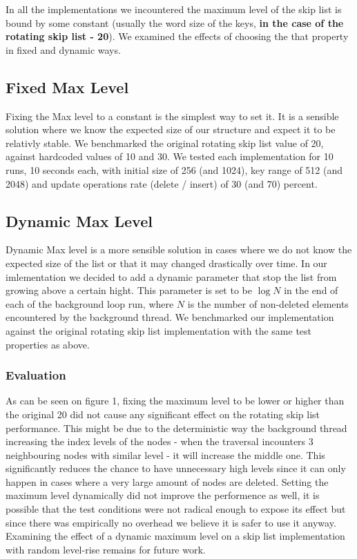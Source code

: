 \documentclass{article}
\begin{document}
In all the implementations we incountered the maximum level of the skip list is bound by some constant (usually the word size of the keys, \textbf{in the case of the rotating skip list - 20}). We examined the effects of choosing the that property in fixed and dynamic ways.

\subsection{Fixed Max Level}
\label{ssec:fml}

Fixing the Max level to a constant is the simplest way to set it. It is a sensible solution where we know the expected size of our structure and expect it to be relativly stable. We benchmarked the original rotating skip list value of 20, against hardcoded values of 10 and 30. We tested each implementation for 10 runs, 10 seconds each, with initial size of 256 (and 1024), key range of 512 (and 2048) and update operations rate (delete / insert) of 30 (and 70) percent.

\subsection{Dynamic Max Level}
\label{ssec:dml}

Dynamic Max level is a more sensible solution in cases where we do not know the expected size of the list or that it may changed drastically over time. In our imlementation we decided to add a dynamic parameter that stop the list from growing above a certain hight. This parameter is set to be $\log{N}$ in the end of each of the background loop run, where $N$ is the number of non-deleted elements encountered by the background thread. We benchmarked our implementation against the original rotating skip list implementation with the same test properties as above.

\subsubsection{Evaluation}
\label{sssec:ml-evl}

As can be seen on figure 1, fixing the maximum level to be lower or higher than the original 20 did not cause any significant effect on the rotating skip list performance. This might be due to the deterministic way the background thread increasing the index levels of the nodes - when the traversal incounters 3 neighbouring nodes with similar level - it will increase the middle one. This significantly reduces the chance to have unnecessary high levels since it can only happen in cases where a very large amount of nodes are deleted. Setting the maximum level dynamically did not improve the performence as well, it is possible that the test conditions were not radical enough to expose its effect but since there was empirically no overhead we believe it is safer to use it anyway. Examining the effect of a dynamic maximum level on a skip list implementation with random level-rise remains for future work.
\end{document}
